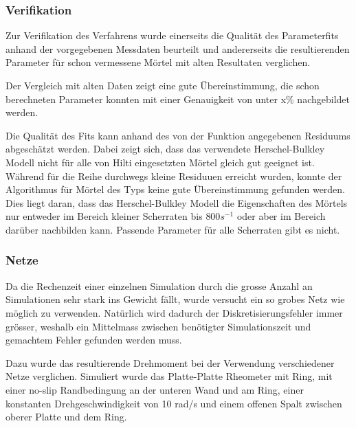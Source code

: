 \subsubsection{Verifikation}
Zur Verifikation des Verfahrens wurde einerseits die Qualität des Parameterfits anhand der vorgegebenen Messdaten beurteilt und andererseits die resultierenden Parameter für schon vermessene Mörtel mit alten Resultaten verglichen.

Der Vergleich mit alten Daten zeigt eine gute Übereinstimmung, die schon berechneten Parameter konnten mit einer Genauigkeit von unter x\%  nachgebildet werden.

Die Qualität des Fits kann anhand des von der Funktion  angegebenen Residuums abgeschätzt werden. Dabei zeigt sich, dass das verwendete Herschel-Bulkley Modell nicht für alle von Hilti eingesetzten Mörtel gleich gut geeignet ist. Während für die \hit{} Reihe durchwegs kleine Residuuen erreicht wurden, konnte der Algorithmus für Mörtel des \re{} Typs keine gute Übereinstimmung gefunden werden.\\
Dies liegt daran, dass das Herschel-Bulkley Modell die Eigenschaften des Mörtels nur entweder im Bereich kleiner Scherraten bis $800 s^{-1}$ oder aber im Bereich darüber nachbilden kann. Passende Parameter für alle Scherraten gibt es nicht.
%
\subsubsection{Netze}
Da die Rechenzeit einer einzelnen Simulation durch die grosse Anzahl an Simulationen sehr stark ins Gewicht fällt, wurde versucht ein so grobes Netz wie möglich zu verwenden. Natürlich wird dadurch der Diskretisierungsfehler immer grösser, weshalb ein Mittelmass zwischen benötigter Simulationszeit und gemachtem Fehler gefunden werden muss.

Dazu wurde das resultierende Drehmoment bei der Verwendung verschiedener Netze verglichen. Simuliert wurde das Platte-Platte Rheometer mit Ring, mit einer no-slip Randbedingung an der unteren Wand und am Ring, einer konstanten Drehgeschwindigkeit von 10 rad/s und einem offenen Spalt zwischen oberer Platte und dem Ring.

